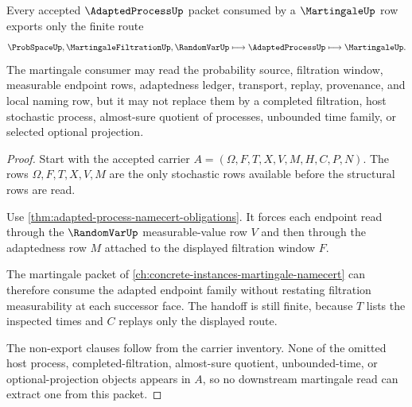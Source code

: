 \begin{theorem}
\label{thm:adapted-process-martingale-handoff}
Every accepted $\AdaptedProcessUp$ packet consumed by a $\MartingaleUp$ row exports only the finite route
$$
\ProbSpaceUp,\MartingaleFiltrationUp,\RandomVarUp \longmapsto \AdaptedProcessUp \longmapsto \MartingaleUp .
$$
The martingale consumer may read the probability source, filtration window, measurable endpoint rows, adaptedness ledger, transport, replay, provenance, and local naming row, but it may not replace them by a completed filtration, host stochastic process, almost-sure quotient of processes, unbounded time family, or selected optional projection.
\end{theorem}
\begin{proof}
Start with the accepted carrier $A=(\Omega,F,T,X,V,M,H,C,P,N)$. The rows $\Omega,F,T,X,V,M$ are the only stochastic rows available before the structural rows are read.

Use \autoref{thm:adapted-process-namecert-obligations}. It forces each endpoint read through the $\RandomVarUp$ measurable-value row $V$ and then through the adaptedness row $M$ attached to the displayed filtration window $F$.

The martingale packet of \autoref{ch:concrete-instances-martingale-namecert} can therefore consume the adapted endpoint family without restating filtration measurability at each successor face. The handoff is still finite, because $T$ lists the inspected times and $C$ replays only the displayed route.

The non-export clauses follow from the carrier inventory. None of the omitted host process, completed-filtration, almost-sure quotient, unbounded-time, or optional-projection objects appears in $A$, so no downstream martingale read can extract one from this packet.
\end{proof}



